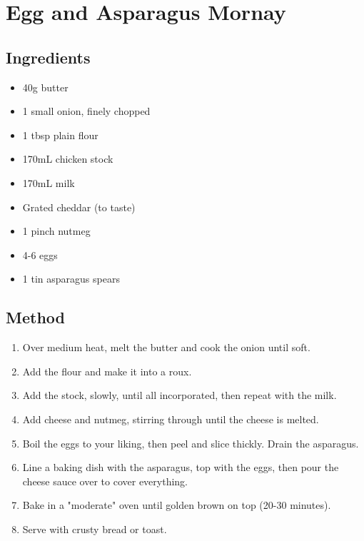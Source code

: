 \clearpage
\section{Egg and Asparagus Mornay}


\subsection{Ingredients}

\begin{itemize}
	\item 40g butter
	\item 1 small onion, finely chopped
	\item 1 tbsp plain flour
	\item 170mL chicken stock
	\item 170mL milk
	\item Grated cheddar (to taste)
	\item 1 pinch nutmeg
	\item 4-6 eggs
	\item 1 tin asparagus spears
\end{itemize}

\subsection{Method}

\begin{enumerate}
	\item Over medium heat, melt the butter and cook the onion until soft.
	\item Add the flour and make it into a roux.
	\item Add the stock, slowly, until all incorporated, then repeat with the milk.
	\item Add cheese and nutmeg, stirring through until the cheese is melted.
	\item Boil the eggs to your liking, then peel and slice thickly. Drain the asparagus.
	\item Line a baking dish with the asparagus, top with the eggs, then pour the cheese sauce over to cover everything.
	\item Bake in a "moderate" oven until golden brown on top (20-30 minutes).
	\item Serve with crusty bread or toast.
\end{enumerate}

